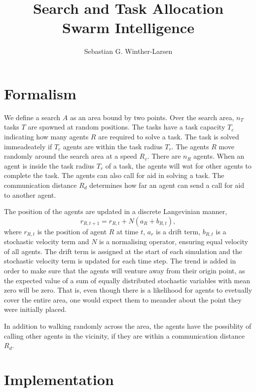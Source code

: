 \documentclass[11pt]{article}
\title{Search and Task Allocation \\
    \small{Swarm Intelligence}}
\author{Sebastian G. Winther-Larsen}
\begin{document}
    
    \maketitle

    \section{Formalism}

    We define a search $A$ as an area bound by two points. Over the search area, 
    $n_T$ tasks $T$ are spawned at random positions. The tasks have a task capacity
    $T_c$ indicating how many agents $R$ are required to solve a task. The task is 
    solved immeadeately if $T_c$ agents are within the task radius $T_r$.
    The agents $R$ move randomly around the search area at a speed $R_v$. There are 
    $n_R$ agents. When an agent is inside the task radius $T_r$ of a task, the agents 
    will wat for other agents to complete the task. The agents can also call for 
    aid in solving a task. The communication distance $R_d$ determines how 
    far an agent can send a call for aid to another agent.

    The position of the agents are updated in a discrete Langevinian manner,
    \begin{equation}
        \label{eq:langevinian}
        r_{R, t+1} = r_{R, t} + N\left(a_R +  b_{R, t}\right),
    \end{equation}
    where $r_{R, t}$ is the position of agent $R$ at time $t$, $a_r$ is a 
    drift term, $b_{R, t}$ is a stochastic velocity term and $N$ is a normalising
    operator, ensuring equal velocity of all agents. The drift term is assigned 
    at the start of each simulation and the stochastic velocity term is updated 
    for each time step. The trend is added in order to make sure that the agents
    will venture away from their origin point, as the expected value of 
    a sum of equally distributed stochastic variables with mean zero will be 
    zero. That is, even though there is a likelihood for agents to evetually 
    cover the entire area, one would expect them to meander about the point 
    they were initially placed.

    In addition to walking randomly across the area, the agents have the 
    possiblity of calling other agents in the vicinity, if they are within 
    a communication distance $R_d$.

    \section{Implementation} 
\end{document}
